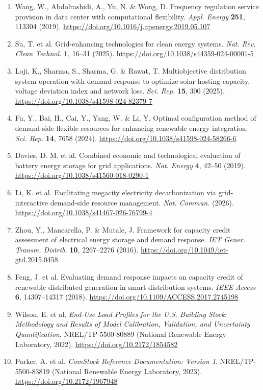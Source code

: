 \documentclass[10pt,a4paper]{article}
\begin{document}
\begin{enumerate}[label=\arabic*.,leftmargin=*,itemsep=4pt]
\item Wang, W., Abdolrashidi, A., Yu, N. \& Wong, D. Frequency regulation service provision in data center with computational flexibility. \emph{Appl. Energy} \textbf{251}, 113304 (2019). \url{https://doi.org/10.1016/j.apenergy.2019.05.107}
\item Su, T. et al. Grid-enhancing technologies for clean energy systems. \emph{Nat. Rev. Clean Technol.} \textbf{1}, 16–31 (2025). \url{https://doi.org/10.1038/s44359-024-00001-5}
\item Loji, K., Sharma, S., Sharma, G. \& Rawat, T. Multiobjective distribution system operation with demand response to optimize solar hosting capacity, voltage deviation index and network loss. \emph{Sci. Rep.} \textbf{15}, 300 (2025). \url{https://doi.org/10.1038/s41598-024-82379-7}
\item Fu, Y., Bai, H., Cai, Y., Yang, W. \& Li, Y. Optimal configuration method of demand-side flexible resources for enhancing renewable energy integration. \emph{Sci. Rep.} \textbf{14}, 7658 (2024). \url{https://doi.org/10.1038/s41598-024-58266-6}
\item Davies, D. M. et al. Combined economic and technological evaluation of battery energy storage for grid applications. \emph{Nat. Energy} \textbf{4}, 42–50 (2019). \url{https://doi.org/10.1038/s41560-018-0290-1}
\item Li, K. et al. Facilitating megacity electricity decarbonization via grid-interactive demand-side resource management. \emph{Nat. Commun.} (2026). \url{https://doi.org/10.1038/s41467-026-76799-4}
\item Zhou, Y., Mancarella, P. \& Mutale, J. Framework for capacity credit assessment of electrical energy storage and demand response. \emph{IET Gener. Transm. Distrib.} \textbf{10}, 2267–2276 (2016). \url{https://doi.org/10.1049/iet-gtd.2015.0458}
\item Feng, J. et al. Evaluating demand response impacts on capacity credit of renewable distributed generation in smart distribution systems. \emph{IEEE Access} \textbf{6}, 14307–14317 (2018). \url{https://doi.org/10.1109/ACCESS.2017.2745198}
\item Wilson, E. et al. \emph{End-Use Load Profiles for the U.S. Building Stock: Methodology and Results of Model Calibration, Validation, and Uncertainty Quantification}. NREL/TP-5500-80889 (National Renewable Energy Laboratory, 2022). \url{https://doi.org/10.2172/1854582}
\item Parker, A. et al. \emph{ComStock Reference Documentation: Version 1}. NREL/TP-5500-83819 (National Renewable Energy Laboratory, 2023). \url{https://doi.org/10.2172/1967948}

\end{enumerate}
\end{document}
